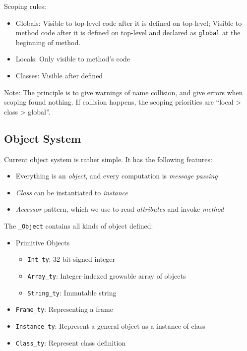 \documentclass[]{article}
\numberwithin{equation}{section}
\numberwithin{figure}{section}
\numberwithin{table}{section}
\begin{document}
Scoping rules:

\begin{itemize}
\itemsep1pt\parskip0pt
\item
  Globals: Visible to top-level code after it is defined on top-level;
  Visible to method code after it is defined on top-level and declared
  as \texttt{global} at the beginning of method.
\item
  Locals: Only visible to method's code
\item
  Classes: Visible after defined
\end{itemize}

Note: The principle is to give warnings of name collision, and
give errors when scoping found nothing. If collision happens, the scoping priorities
are ``local \textgreater{} class \textgreater{} global''.

\subsection{Object System}\label{object-system}

Current object system is rather simple. It has the following features:

\begin{itemize}
\itemsep1pt\parskip0pt
\item
  Everything is an \emph{object}, and every computation is \emph{message
  passing}
\item
  \emph{Class} can be instantiated to \emph{instance}
\item
  \emph{Accessor} pattern, which we use to read \emph{attributes} and
  invoke \emph{method}
\end{itemize}

The \texttt{\_Object} contains all kinds of object defined:

\begin{itemize}
\itemsep1pt\parskip0pt
\item
  Primitive Objects

  \begin{itemize}
  \itemsep1pt\parskip0pt
  \item
    \texttt{Int\_ty}: 32-bit signed integer
  \item
    \texttt{Array\_ty}: Integer-indexed growable array of objects
  \item
    \texttt{String\_ty}: Immutable string
  \end{itemize}
\item
  \texttt{Frame\_ty}: Representing a frame
\item
  \texttt{Instance\_ty}: Represent a general object as a instance of
  class
\item
  \texttt{Class\_ty}: Represent class definition
\end{itemize}
\end{document}
